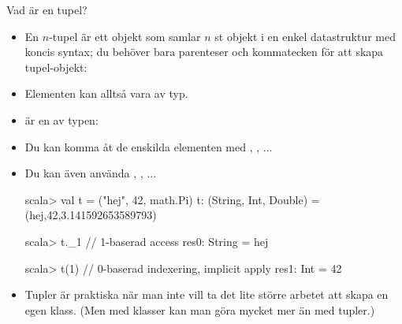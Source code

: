\begin{Slide}{Vad är en tupel?}\SlideFontSmall

\begin{itemize}
\item En $n$-tupel är ett objekt som samlar $n$ st objekt i en enkel datastruktur med koncis syntax;
du behöver bara parenteser och kommatecken för att skapa tupel-objekt: ~~
\item Elementen kan alltså vara av  typ.

\item
{} är en  av typen: 

\pause

\item Du kan komma åt de enskilda elementen med , , ...  
\item Du kan även använda , , ...  

\begin{REPL}
scala> val t = ("hej", 42, math.Pi)
t: (String, Int, Double) = (hej,42,3.141592653589793)

scala> t._1        // 1-baserad access
res0: String = hej

scala> t(1)        // 0-baserad indexering, implicit apply
res1: Int = 42
\end{REPL}

\pause

\item Tupler är praktiska när man inte vill ta det lite större arbetet att skapa en egen klass.
(Men med klasser kan man göra mycket mer än med tupler.)

\end{itemize}

\end{Slide}


